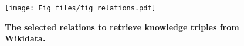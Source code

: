 \begin{figure}[H]
\centerline{\texttt{[image: Fig\_files/fig\_relations.pdf]}}
\vspace{-0.2cm}
\caption{\textbf{The selected relations to retrieve knowledge triples from Wikidata.}}
\label{fig:relations}
\end{figure}